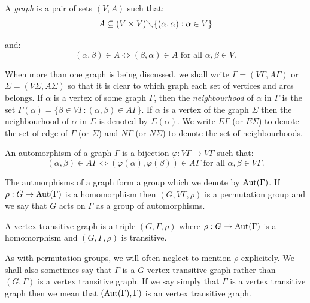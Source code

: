 \begin{definition} [Graph]
A {\it graph} is a pair of sets $(V,A)$ such that:
$$A \subseteq (V \times V) \diagdown \{ (\alpha,\alpha) : \alpha \in V \}$$

and: 
$$(\alpha,\beta) \in A \Longleftrightarrow (\beta,\alpha) \in A
\mbox{ for all } \alpha, \beta \in V.$$
\end{definition}

When more than one graph is being discussed, we shall write
$\Gamma = (V \Gamma, A \Gamma)$ or $\Sigma = (V \Sigma, A \Sigma)$
so that it is clear to which graph each set of vertices and arcs belongs.
If $\alpha$ is a vertex of some graph $\Gamma$,
then the {\it neighbourhood} of $\alpha$ in $\Gamma$
is the set $\Gamma(\alpha) = \{ \beta \in V \Gamma : (\alpha,\beta) \in A \Gamma \}$.
If $\alpha$ is a vertex of the graph $\Sigma$
then the neighbourhood of $\alpha$ in $\Sigma$ is denoted by $\Sigma(\alpha)$.
We write $E \Gamma$ (or $E \Sigma$) to denote the set of edge of $\Gamma$ (or $\Sigma$)
and $N \Gamma$ (or $N \Sigma$) to denote the set of neighbourhoods.

\begin{definition} 
An automorphism of a graph $\Gamma$ is a bijection
$\varphi : V \Gamma \to V \Gamma$ such that:
$$ (\alpha,\beta) \in A \Gamma \Longleftrightarrow
(\varphi(\alpha),\varphi(\beta)) \in A \Gamma \mbox{ for all } \alpha,\beta \in V \Gamma.$$ 
\end{definition}

The autmorphisms of a graph form a group which we denote by $\operatorname{Aut}(\Gamma)$.
If $\rho : G \to \operatorname{Aut}(\Gamma)$ is a homomorphism
then $(G,V \Gamma,\rho)$ is a permutation group
and we say that $G$ acts on $\Gamma$ as a group of automorphisms.

\begin{definition} 
A vertex transitive graph is a triple $(G,\Gamma,\rho)$
where $\rho : G \to \operatorname{Aut}(\Gamma)$ is a homomorphism
and $(G,\Gamma,\rho)$ is transitive.
\end{definition}

As with permutation groups, we will often neglect to mention $\rho$
explicitely. We shall also sometimes say that $\Gamma$ is a $G$-vertex
transitive graph rather than $(G,\Gamma)$ is a vertex transitive graph.
If we say simply that $\Gamma$ is a vertex transitive graph
then we mean that $(\operatorname{Aut}(\Gamma),\Gamma)$ 
is an vertex transitive graph.

